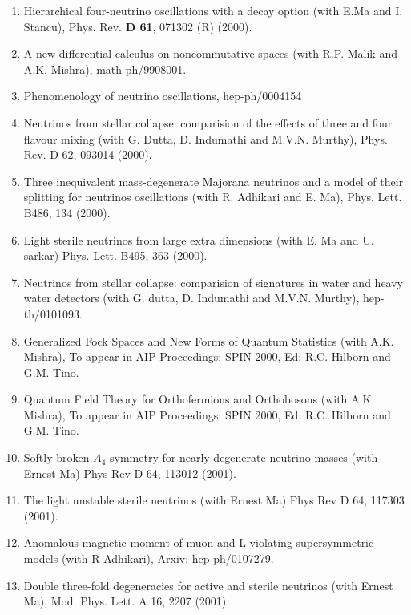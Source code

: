 \begin{enumerate}
\item Hierarchical four-neutrino oscillations with a decay option (with
E.Ma and I. Stancu), Phys. Rev. {\bf D 61}, 071302 (R) (2000).

\item A new differential calculus on noncommutative spaces (with R.P.
Malik and A.K. Mishra), math-ph/9908001.

\item Phenomenology of neutrino oscillations, hep-ph/0004154

\item Neutrinos from stellar collapse: comparision of the effects of three and four flavour mixing (with G. Dutta, D. Indumathi and M.V.N. Murthy), Phys. Rev. D 62, 093014 (2000).

\item Three inequivalent mass-degenerate Majorana neutrinos and a model of their splitting for neutrinos oscillations (with R. Adhikari and E. Ma), Phys. Lett. B486, 134 (2000).

\item Light sterile neutrinos from large extra dimensions (with E. Ma and U. sarkar) Phys. Lett. B495, 363 (2000).

\item Neutrinos from stellar collapse: comparision of signatures in water and heavy water detectors (with G. dutta, D. Indumathi and M.V.N. Murthy), hep-th/0101093.

\item Generalized Fock Spaces and New Forms of Quantum Statistics (with A.K. Mishra), To appear in AIP Proceedings: SPIN 2000, Ed: R.C. Hilborn and G.M. Tino.

\item Quantum Field Theory for Orthofermions and Orthobosons (with A.K. Mishra), To appear in AIP Proceedings: SPIN 2000, Ed: R.C. Hilborn and G.M. Tino.

\item Softly broken $A_4$ symmetry for nearly degenerate neutrino masses (with Ernest Ma) Phys Rev D 64, 113012 (2001).

\item The light unstable sterile neutrinos (with Ernest Ma) Phys Rev D 64, 117303 (2001).

\item Anomalous magnetic moment of muon and L-violating supersymmetric models (with R Adhikari), Arxiv: hep-ph/0107279.

\item Double three-fold degeneracies for active and sterile neutrinos (with Ernest Ma), Mod. Phys. Lett. A 16, 2207 (2001).


\end{enumerate}
